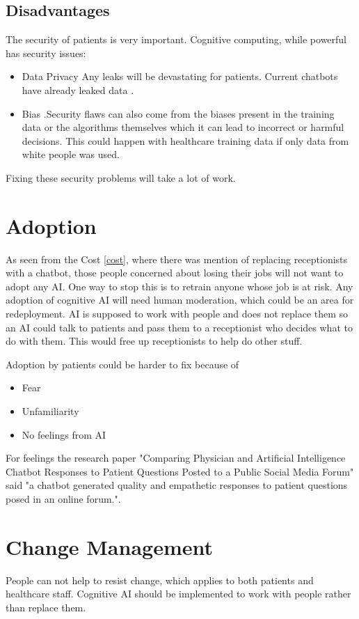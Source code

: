 \documentclass{article}
\begin{document}
\subsection{Disadvantages}
The security of patients is very important. Cognitive computing, while powerful has security issues:
\begin{itemize}
	\item Data Privacy  Any leaks will be devastating for patients. Current chatbots have already leaked data \cite{wired}.

	\item Bias .Security flaws can also come from the biases present in the training data or the algorithms themselves which it can lead to incorrect or harmful decisions. This could happen with healthcare training data if only data from white people was used.
\end{itemize}

Fixing these security problems will take a lot of work.

\section{Adoption}
As seen from the Cost \ref{cost}, where there was mention of replacing receptionists with a chatbot, those people concerned about losing their jobs will not want to adopt any AI. One way to stop this is to retrain anyone whose job is at risk. Any adoption of cognitive AI will need human moderation, which could be an area for redeployment. 
AI is supposed to work with people and does not replace them so an AI could talk to patients and pass them to a receptionist who decides what to do with them. This would free up receptionists to help do other stuff.

Adoption by patients could be harder to fix because of
\begin{itemize}
	\item Fear
	\item Unfamiliarity
	\item No feelings from AI
\end{itemize}
For feelings the research paper "Comparing Physician and Artificial Intelligence Chatbot Responses to Patient Questions Posted to a Public Social Media Forum" \cite{bedside} said "a chatbot generated quality and empathetic responses to patient questions posed in an online forum.".

\section{Change Management}
People can not help to resist change, which applies to both patients and healthcare staff. Cognitive AI should be implemented to work with people rather than replace them.
\end{document}
